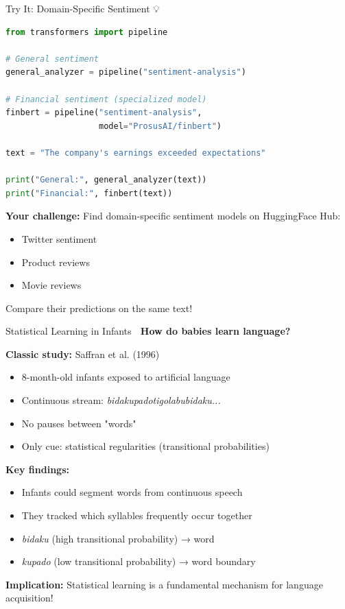 \documentclass[aspectratio=169]{beamer}
\begin{document}
\begin{frame}[fragile]{Try It: Domain-Specific Sentiment 💡}
    \begin{lstlisting}[language=Python]
from transformers import pipeline

# General sentiment
general_analyzer = pipeline("sentiment-analysis")

# Financial sentiment (specialized model)
finbert = pipeline("sentiment-analysis",
                   model="ProsusAI/finbert")

text = "The company's earnings exceeded expectations"

print("General:", general_analyzer(text))
print("Financial:", finbert(text))
    \end{lstlisting}

    \vspace{0.5em}
    \textbf{Your challenge:} Find domain-specific sentiment models on HuggingFace Hub:
    \begin{itemize}\setlength{\itemsep}{0pt}
        \item Twitter sentiment
        \item Product reviews
        \item Movie reviews
    \end{itemize}
    Compare their predictions on the same text!
\end{frame}

\begin{frame}[shrink=10]{Statistical Learning in Infants 👶}
    \textbf{How do babies learn language?}

    \vspace{0.5em}
    \textbf{Classic study:} Saffran et al. (1996)
    \begin{itemize}\setlength{\itemsep}{0pt}
        \item 8-month-old infants exposed to artificial language
        \item Continuous stream: \textit{bidakupadotigolabubidaku...}
        \item No pauses between "words"
        \item Only cue: statistical regularities (transitional probabilities)
    \end{itemize}

    \vspace{0.5em}
    \textbf{Key findings:}
    \begin{itemize}\setlength{\itemsep}{0pt}
        \item Infants could segment words from continuous speech
        \item They tracked which syllables frequently occur together
        \item \textit{bidaku} (high transitional probability) → word
        \item \textit{kupado} (low transitional probability) → word boundary
    \end{itemize}

    \vspace{0.5em}
    \textbf{Implication:} Statistical learning is a fundamental mechanism for language acquisition!
\end{frame}
\end{document}
